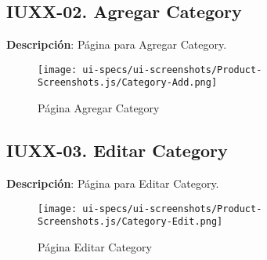 \subsection{IUXX-02. Agregar Category} \label{sec:ui-page-create-category}

\textbf{Descripci\'on}: P\'agina para Agregar Category.\\

\begin{figure}[H]
	\label{tab:ui-create-category-page}
	\texttt{[image: ui-specs/ui-screenshots/Product-Screenshots.js/Category-Add.png]}
	\caption{P\'agina Agregar Category}
\end{figure}

\begin{table}[H]
	\caption{Forma Agregar Category}
	\label{tab:ui-create-category-form}
\end{table}

\clearpage
\subsection{IUXX-03. Editar Category} \label{sec:ui-page-update-category}

\textbf{Descripci\'on}: P\'agina para Editar Category.\\

\begin{figure}[H]
	\label{tab:ui-edit-category-page}
	\texttt{[image: ui-specs/ui-screenshots/Product-Screenshots.js/Category-Edit.png]}
	\caption{P\'agina Editar Category}
\end{figure}

\begin{table}[H]
	\caption{Forma Editar Category}
	\label{tab:ui-update-category-form}
\end{table}

